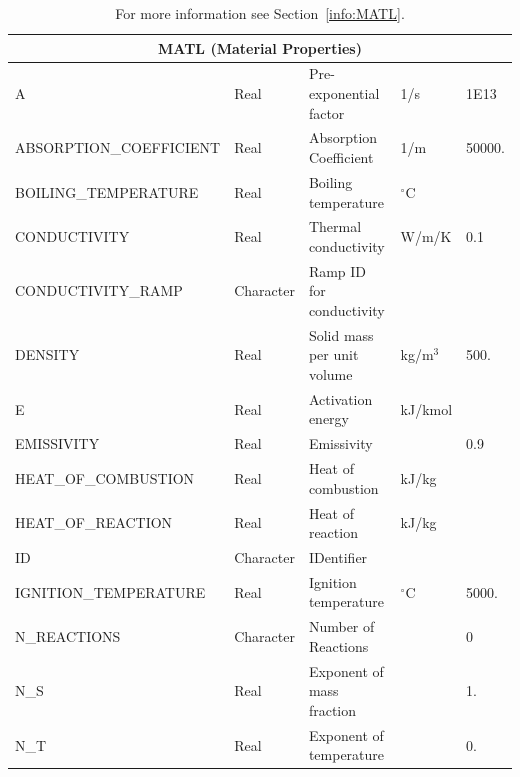 \documentclass[11pt]{book}
\begin{document}
\begin{table}[H]
\caption{For more information see Section~\ref{info:MATL}.}\label{tbl:MATL}
\noindent
\begin{tabular*}{\textwidth}{@{\extracolsep{\fill}}|l|l|l|l|l|}
\hline
\multicolumn{5}{|c|}{{\ct MATL} (Material Properties)} \\ \hline \hline
{\ct A}                       & Real        & Pre-exponential factor      &    1/s              & 1E13      \\ \hline
{\ct ABSORPTION\_COEFFICIENT} & Real        & Absorption Coefficient      &    1/m              & 50000.     \\ \hline
{\ct BOILING\_TEMPERATURE}    & Real        & Boiling temperature         & $^\circ$C           &        \\ \hline
{\ct CONDUCTIVITY}            & Real        & Thermal conductivity        & W/m/K               & 0.1    \\ \hline
{\ct CONDUCTIVITY\_RAMP}      & Character   & Ramp ID for conductivity    &                     &        \\ \hline
{\ct DENSITY}                 & Real        & Solid mass per unit volume  & kg/m$^3$            & 500.   \\ \hline
{\ct E}                       & Real        & Activation energy           & kJ/kmol             &        \\ \hline
{\ct EMISSIVITY    }          & Real        & Emissivity                  &                     & 0.9    \\ \hline
{\ct HEAT\_OF\_COMBUSTION}    & Real        & Heat of combustion          & kJ/kg               &        \\ \hline
{\ct HEAT\_OF\_REACTION}      & Real        & Heat of reaction            & kJ/kg               &        \\ \hline
{\ct ID     }                 & Character   & IDentifier                  &                     &        \\ \hline
{\ct IGNITION\_TEMPERATURE}   & Real        & Ignition temperature    & $^\circ$C             & 5000.        \\ \hline
{\ct N\_REACTIONS}            & Character   & Number of Reactions         &                     & 0      \\ \hline
{\ct N\_S}                    & Real        & Exponent of mass fraction   &                     & 1.     \\ \hline
{\ct N\_T}                    & Real        & Exponent of temperature     &                     & 0.     \\ \hline

\end{tabular*}
\end{table}
\end{document}
